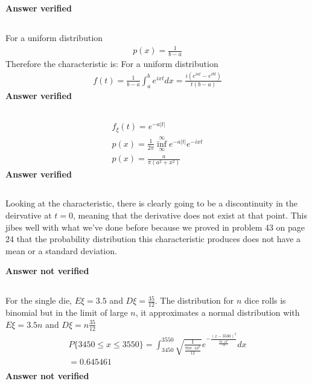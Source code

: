 \textbf{Answer verified}


\subsection{}
For a uniform distribution
\begin{eqnarray}
	p(x) = \frac{1}{b-a}
\end{eqnarray}
Therefore the characteristic is:
For a uniform distribution
\begin{eqnarray}
	f(t) = \frac{1}{b-a} \int_a^b e^{i x t} dx = \frac{i \left(e^{i a t}-e^{i b t}\right)}{t(b-a)}
\end{eqnarray}
\textbf{Answer verified}


\subsection{}
\begin{eqnarray}
	f_{\xi} (t) = e^{-a|t|} \\
	p(x) = \frac{1}{2 \pi} \inf_{\infty}^{\infty} e^{-a|t|} e^{- i x t} \\
	p(x) = \frac{a}{\pi(a^2+x^2)}
\end{eqnarray} 
\textbf{Answer verified}

\subsection{}
Looking at the characteristic, there is clearly going to be a discontinuity in the deirvative at $t=0$, meaning that the derivative does not exist at that point.  This jibes well with what we've done before because we proved in problem 43 on page 24 that the probability distribution this characteristic produces does not have a mean or a standard deviation.

\textbf{Answer not verified}


\subsection{}
For the single die, $E\xi = 3.5$ and $D\xi = \frac{35}{12}$.  The distribution for $n$ dice rolls is binomial but in the limit of large $n$, it approximates a normal distribution with $E\xi = 3.5n$ and $D\xi = n \frac{35}{12}$
\begin{eqnarray}
	P\{ 3450 \leq x \leq 3550  \} = \int_{3450}^{3550} \sqrt{\frac{1}{\frac{70 \pi \cdot 10^3}{12}}}e^{-\frac{(x-3500)^2}{\frac{70 \cdot 10^3}{12}}} dx \\
	= 0.645461  \\
\end{eqnarray} 
\textbf{Answer not verified}

